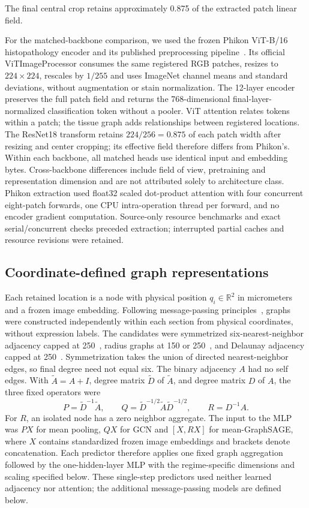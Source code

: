 The final central crop retains approximately 0.875 of the extracted patch linear field.

For the matched-backbone comparison, we used the frozen Phikon ViT-B/16 histopathology encoder and its published preprocessing pipeline~\cite{dosovitskiy2021vit,filiot2023}. Its official ViTImageProcessor consumes the same registered RGB patches, resizes to $224\times224$, rescales by $1/255$ and uses ImageNet channel means and standard deviations, without augmentation or stain normalization. The 12-layer encoder preserves the full patch field and returns the 768-dimensional final-layer-normalized classification token without a pooler. ViT attention relates tokens within a patch; the tissue graph adds relationships between registered locations. The ResNet18 transform retains $224/256=0.875$ of each patch width after resizing and center cropping; its effective field therefore differs from Phikon's. Within each backbone, all matched heads use identical input and embedding bytes. Cross-backbone differences include field of view, pretraining and representation dimension and are not attributed solely to architecture class. Phikon extraction used float32 scaled dot-product attention with four concurrent eight-patch forwards, one CPU intra-operation thread per forward, and no encoder gradient computation. Source-only resource benchmarks and exact serial/concurrent checks preceded extraction; interrupted partial caches and resource revisions were retained.

\subsection{Coordinate-defined graph representations}
\label{sec:graph_methods}
Each retained location is a node with physical position $q_i\in\mathbb R^2$ in micrometers and a frozen image embedding. Following message-passing principles~\cite{gilmer2017}, graphs were constructed independently within each section from physical coordinates, without expression labels. The candidates were symmetrized six-nearest-neighbor adjacency capped at 250~\um{}, radius graphs at 150 or 250~\um{}, and Delaunay adjacency capped at 250~\um{}. Symmetrization takes the union of directed nearest-neighbor edges, so final degree need not equal six. The binary adjacency $A$ had no self edges. With $\widetilde A=A+I$, degree matrix $\widetilde D$ of $\widetilde A$, and degree matrix $D$ of $A$, the three fixed operators were
\[
 P=\widetilde D^{-1}\widetilde A,\qquad
 Q=\widetilde D^{-1/2}\widetilde A\widetilde D^{-1/2},\qquad
 R=D^{-1}A.
\]
For $R$, an isolated node has a zero neighbor aggregate. The input to the MLP was $PX$ for mean pooling, $QX$ for GCN and $[X,RX]$ for mean-GraphSAGE, where $X$ contains standardized frozen image embeddings and brackets denote concatenation. Each predictor therefore applies one fixed graph aggregation followed by the one-hidden-layer MLP with the regime-specific dimensions and scaling specified below. These single-step predictors used neither learned adjacency nor attention; the additional message-passing models are defined below.

